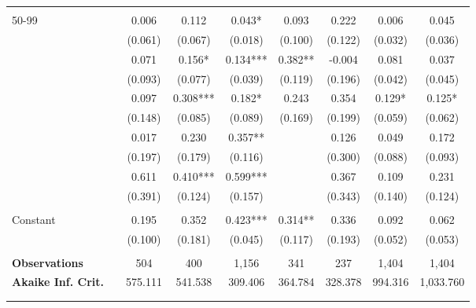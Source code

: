 \begin{tabular*}{\linewidth}{@{\extracolsep{\fill} } llccccccc}
&&&&&&&&\\%
\multirow{2}{*}{\hspace{0.2cm}50{-}99}&&0.006&0.112&0.043*&0.093&0.222&0.006&0.045\\%
&&(0.061)&(0.067)&(0.018)&(0.100)&(0.122)&(0.032)&(0.036)\\%
\arrayrulecolor{white}%
\hline%
\arrayrulecolor{white}%
\hline%
\arrayrulecolor{white}%
\hline%
\arrayrulecolor{white}%
\hline%
\arrayrulecolor{white}%
\hline%
\multirow{2}{*}{\hspace{0.2cm}100{-}199}&&0.071&0.156*&0.134***&0.382**&{-}0.004&0.081&0.037\\%
&&(0.093)&(0.077)&(0.039)&(0.119)&(0.196)&(0.042)&(0.045)\\%
\arrayrulecolor{white}%
\hline%
\arrayrulecolor{white}%
\hline%
\arrayrulecolor{white}%
\hline%
\arrayrulecolor{white}%
\hline%
\arrayrulecolor{white}%
\hline%
\multirow{2}{*}{\hspace{0.2cm}200{-}299}&&0.097&0.308***&0.182*&0.243&0.354&0.129*&0.125*\\%
&&(0.148)&(0.085)&(0.089)&(0.169)&(0.199)&(0.059)&(0.062)\\%
\arrayrulecolor{white}%
\hline%
\arrayrulecolor{white}%
\hline%
\arrayrulecolor{white}%
\hline%
\arrayrulecolor{white}%
\hline%
\arrayrulecolor{white}%
\hline%
\multirow{2}{*}{\hspace{0.2cm}300{-}399}&&0.017&0.230&0.357**&&0.126&0.049&0.172\\%
&&(0.197)&(0.179)&(0.116)&&(0.300)&(0.088)&(0.093)\\%
\arrayrulecolor{white}%
\hline%
\arrayrulecolor{white}%
\hline%
\arrayrulecolor{white}%
\hline%
\arrayrulecolor{white}%
\hline%
\arrayrulecolor{white}%
\hline%
\multirow{2}{*}{\hspace{0.2cm}400+}&&0.611&0.410***&0.599***&&0.367&0.109&0.231\\%
&&(0.391)&(0.124)&(0.157)&&(0.343)&(0.140)&(0.124)\\%
\arrayrulecolor{white}%
\hline%
\arrayrulecolor{white}%
\hline%
\arrayrulecolor{white}%
\hline%
\arrayrulecolor{white}%
\hline%
\arrayrulecolor{white}%
\hline%
&&&&&&&&\\%
\multirow{2}{*}{Constant}&&0.195&0.352&0.423***&0.314**&0.336&0.092&0.062\\%
&&(0.100)&(0.181)&(0.045)&(0.117)&(0.193)&(0.052)&(0.053)\\%
\arrayrulecolor{white}%
\hline%
\arrayrulecolor{white}%
\hline%
\arrayrulecolor{white}%
\hline%
\arrayrulecolor{white}%
\hline%
\arrayrulecolor{white}%
\hline%
&&&&&&&&\\%
\bfseries Observations&&504&400&1,156&341&237&1,404&1,404\\%
\bfseries Akaike Inf. Crit.&&575.111&541.538&309.406&364.784&328.378&994.316&1,033.760\\%
\arrayrulecolor{white}%
\hline%
\arrayrulecolor{white}%
\hline%
\arrayrulecolor{white}%
\hline%
\arrayrulecolor{white}%
\hline%
\arrayrulecolor{white}%
\hline%
&&&&&&&&\\%
\arrayrulecolor{black}%
\hline%
\end{tabular*}